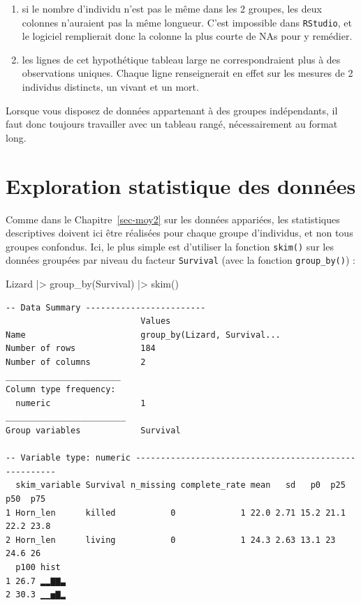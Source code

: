 \documentclass[
  french,
  a4paper,
  DIV=11,
  numbers=noendperiod,
  oneside]{scrreprt}
\newenvironment{Shaded}{}{}
\newcommand{\FunctionTok}[1]{\textcolor[rgb]{0.44,0.26,0.76}{#1}}
\newcommand{\NormalTok}[1]{\textcolor[rgb]{0.14,0.16,0.18}{#1}}
\newcommand{\SpecialCharTok}[1]{\textcolor[rgb]{0.00,0.36,0.77}{#1}}
\providecommand{\tightlist}{%
  \setlength{\itemsep}{0pt}\setlength{\parskip}{0pt}}
\begin{document}
\begin{enumerate}
\def\labelenumi{\arabic{enumi}.}
\tightlist
\item
  si le nombre d'individu n'est pas le même dans les 2 groupes, les deux
  colonnes n'auraient pas la même longueur. C'est impossible dans
  \texttt{RStudio}, et le logiciel remplierait donc la colonne la plus
  courte de NAs pour y remédier.
\item
  les lignes de cet hypothétique tableau large ne correspondraient plus
  à des observations uniques. Chaque ligne renseignerait en effet sur
  les mesures de 2 individus distincts, un vivant et un mort.
\end{enumerate}

Lorsque vous disposez de données appartenant à des groupes indépendants,
il faut donc toujours travailler avec un tableau rangé, nécessairement
au format long.

\section{Exploration statistique des
données}\label{exploration-statistique-des-donnuxe9es-1}

Comme dans le Chapitre~\ref{sec-moy2} sur les données appariées, les
statistiques descriptives doivent ici être réalisées pour chaque groupe
d'individus, et non tous groupes confondus. Ici, le plus simple est
d'utiliser la fonction \texttt{skim()} sur les données groupées par
niveau du facteur \texttt{Survival} (avec la fonction
\texttt{group\_by()}) :

\begin{Shaded}
\begin{Highlighting}[]
\NormalTok{Lizard }\SpecialCharTok{|\textgreater{}}
  \FunctionTok{group\_by}\NormalTok{(Survival) }\SpecialCharTok{|\textgreater{}}
  \FunctionTok{skim}\NormalTok{()}
\end{Highlighting}
\end{Shaded}

\begin{verbatim}
-- Data Summary ------------------------
                           Values                      
Name                       group_by(Lizard, Survival...
Number of rows             184                         
Number of columns          2                           
_______________________                                
Column type frequency:                                 
  numeric                  1                           
________________________                               
Group variables            Survival                    

-- Variable type: numeric ------------------------------------------------------
  skim_variable Survival n_missing complete_rate mean   sd   p0  p25  p50  p75
1 Horn_len      killed           0             1 22.0 2.71 15.2 21.1 22.2 23.8
2 Horn_len      living           0             1 24.3 2.63 13.1 23   24.6 26  
  p100 hist 
1 26.7 ▂▂▇▇▃
2 30.3 ▁▁▅▇▂
\end{verbatim}
\end{document}
